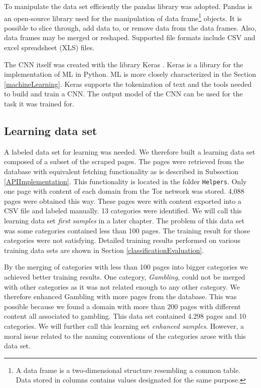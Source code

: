 To manipulate the data set efficiently the pandas library \cite{pandas} was adopted. Pandas is an open-source library used for the manipulation of data frame\footnote{A data frame is a two-dimensional structure resembling a common table. Data stored in columns contains values designated for the same purpose. } objects. It is possible to slice through, add data to, or remove data from the data frames. Also, data frames may be merged or reshaped. Supported file formats include CSV and excel spreadsheet (XLS) files.

The CNN itself was created with the library Keras \cite{keras}. Keras is a library for the implementation of ML in Python. ML is more closely characterized in the Section \ref{machineLearning}. Keras supports the tokenization of text and the tools needed to build and train a CNN. The output model of the CNN can be used for the task it was trained for.

\subsection{Learning data set} \label{LearningDatasetImplementation}
A labeled data set for learning was needed. We therefore built a learning data set composed of a subset of the scraped pages. The pages were retrieved from the database with equivalent fetching functionality as is described in Subsection \ref{APIImplementation}. This functionality is located in the folder \texttt{Helpers}. Only one page with content of each domain from the Tor network was stored. 4,088 pages were obtained this way. These pages were with content exported into a CSV file and labeled manually. 13 categories were identified. We will call this learning data set \textit{first samples} in a later chapter. The problem of this data set was some categories contained less than 100 pages. The training result for those categories were not satisfying. Detailed training results performed on various training data sets are shown in Section \ref{classificationEvaluation}. 

By the merging of categories with less than 100 pages into bigger categories we achieved better training results. One category, \textit{Gambling}, could not be merged with other categories as it was not related enough to any other category. We therefore enhanced Gambling with more pages from the database. This was possible because we found a domain with more than 200 pages with different content all associated to gambling. This data set contained 4.298 pages and 10 categories. We will further call this learning set \textit{enhanced samples}. However, a moral issue related to the naming conventions of the categories arose with this data set. 

